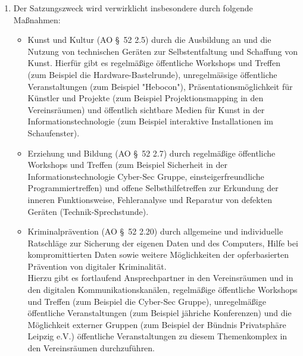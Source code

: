 \documentclass[10pt,a4paper]{scrartcl}
\newcommand{\qs}[1]{\glqq#1\grqq}
\begin{document}
\begin{enumerate}
\item 	Der Satzungszweck wird verwirklicht insbesondere durch folgende Ma{\ss}nahmen:
	\begin{itemize}
		\item	Kunst und Kultur (AO \S\ 52 2.5) durch die Ausbildung an und die Nutzung von technischen Ger{\"a}ten zur
				Selbstentfaltung und Schaffung von Kunst. Hierf{\"u}r gibt es regelm{\"a}{\ss}ige {\"o}ffentliche Workshops und Treffen
				(zum Beispiel die \qs{Hardware-Bastelrunde}), unregelm{\"a}{\"ss}ige {\"o}ffentliche Veranstaltungen (zum Beispiel
				"Hebocon"), Pr{\"a}sentationsm{\"o}glichkeit f{\"u}r K{\"u}nstler und Projekte (zum Beispiel \qs{Projektionsmapping}
				in den Vereinsr{\"a}umen) und {\"o}ffentlich sichtbare Medien f{\"u}r Kunst in der Informationstechnologie
				(zum Beispiel interaktive Installationen im Schaufenster).
		\item	Erziehung und Bildung (AO \S\ 52 2.7) durch regelm{\"a}{\ss}ige {\"o}ffentliche Workshops und Treffen (zum Beispiel
				Sicherheit in der Informationstechnologie \qs{Cyber-Sec Gruppe}, einsteigerfreundliche Programmiertreffen)
				und offene Selbsthilfetreffen zur Erkundung der inneren Funktionsweise, Fehleranalyse und Reparatur von
				defekten Ger{\"a}ten (\qs{Technik-Sprechstunde}).
		\item	Kriminalpr{\"a}vention (AO \S\ 52 2.20) durch allgemeine und individuelle Ratschl{\"a}ge zur Sicherung der eigenen
				Daten und des Computers, Hilfe bei kompromittierten Daten sowie weitere M{\"o}glichkeiten der
				opferbasierten Pr{\"a}vention von digitaler Kriminalit{\"a}t.\\
				Hierzu gibt es fortlaufend Ansprechpartner in den Vereinsr{\"a}umen und in den digitalen Kommunikationskan{\"a}len,
				regelm{\"a}{\ss}ige {\"o}ffentliche Workshops und Treffen (zum Beispiel die \qs{Cyber-Sec Gruppe}), unregelm{\"a}{\ss}ige
				{\"o}ffentliche Veranstaltungen (zum Beispiel j{\"a}hriche Konferenzen) und die M{\"o}glichkeit externer Gruppen
				(zum Beispiel der B{\"u}ndnis Privatsph{\"a}re Leipzig e.V.) {\"o}ffentliche Veranstaltungen zu diesem Themenkomplex
				in den Vereinsr{\"a}umen durchzuf{\"u}hren.\\
	\end{itemize}
\end{enumerate}
%
%
\end{document}
